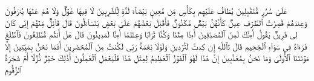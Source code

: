 \stopbuffer
\startbuffer[\q:37:44]
عَلَىٰ سُرُرࣲ مُّتَقَٰبِلِینَ%
\stopbuffer
\startbuffer[\q:37:45]
یُطَافُ عَلَیۡهِم بِكَأۡسࣲ مِّن مَّعِینِۭ%
\stopbuffer
\startbuffer[\q:37:46]
بَیۡضَاۤءَ لَذَّةࣲ لِّلشَّٰرِبِینَ%
\stopbuffer
\startbuffer[\q:37:47]
لَا فِیهَا غَوۡلࣱ وَلَا هُمۡ عَنۡهَا یُنزَفُونَ%
\stopbuffer
\startbuffer[\q:37:48]
وَعِندَهُمۡ قَٰصِرَٰتُ ٱلطَّرۡفِ عِینࣱ%
\stopbuffer
\startbuffer[\q:37:49]
كَأَنَّهُنَّ بَیۡضࣱ مَّكۡنُونࣱ%
\stopbuffer
\startbuffer[\q:37:50]
فَأَقۡبَلَ بَعۡضُهُمۡ عَلَىٰ بَعۡضࣲ یَتَسَاۤءَلُونَ%
\stopbuffer
\startbuffer[\q:37:51]
قَالَ قَاۤئِلࣱ مِّنۡهُمۡ إِنِّی كَانَ لِی قَرِینࣱ%
\stopbuffer
\startbuffer[\q:37:52]
یَقُولُ أَءِنَّكَ لَمِنَ ٱلۡمُصَدِّقِینَ%
\stopbuffer
\startbuffer[\q:37:53]
أَءِذَا مِتۡنَا وَكُنَّا تُرَابࣰا وَعِظَٰمًا أَءِنَّا لَمَدِینُونَ%
\stopbuffer
\startbuffer[\q:37:54]
قَالَ هَلۡ أَنتُم مُّطَّلِعُونَ%
\stopbuffer
\startbuffer[\q:37:55]
فَٱطَّلَعَ فَرَءَاهُ فِی سَوَاۤءِ ٱلۡجَحِیمِ%
\stopbuffer
\startbuffer[\q:37:56]
قَالَ تَٱللَّهِ إِن كِدتَّ لَتُرۡدِینِ%
\stopbuffer
\startbuffer[\q:37:57]
وَلَوۡلَا نِعۡمَةُ رَبِّی لَكُنتُ مِنَ ٱلۡمُحۡضَرِینَ%
\stopbuffer
\startbuffer[\q:37:58]
أَفَمَا نَحۡنُ بِمَیِّتِینَ%
\stopbuffer
\startbuffer[\q:37:59]
إِلَّا مَوۡتَتَنَا ٱلۡأُولَىٰ وَمَا نَحۡنُ بِمُعَذَّبِینَ%
\stopbuffer
\startbuffer[\q:37:60]
إِنَّ هَٰذَا لَهُوَ ٱلۡفَوۡزُ ٱلۡعَظِیمُ%
\stopbuffer
\startbuffer[\q:37:61]
لِمِثۡلِ هَٰذَا فَلۡیَعۡمَلِ ٱلۡعَٰمِلُونَ%
\stopbuffer
\startbuffer[\q:37:62]
أَذَٰلِكَ خَیۡرࣱ نُّزُلًا أَمۡ شَجَرَةُ ٱلزَّقُّومِ%
\stopbuffer
